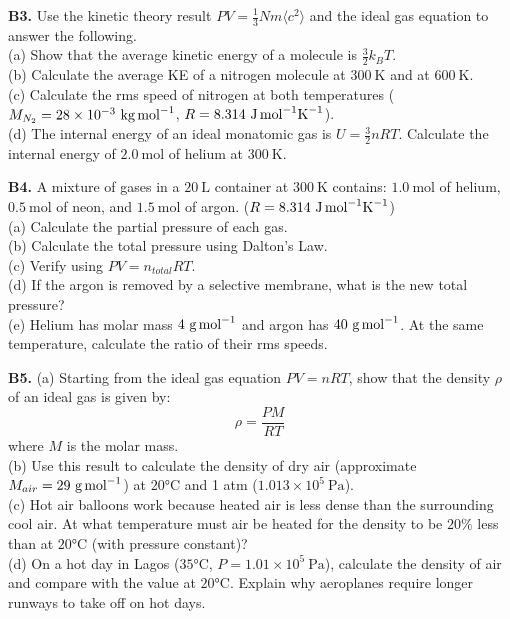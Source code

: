 \begin{exercisebox}[14]
\vspace{0.4cm}

\textbf{B3.} Use the kinetic theory result
$PV = \frac{1}{3}Nm\langle c^2\rangle$ and the
ideal gas equation to answer the following.\\[4pt]
(a) Show that the average kinetic energy of a
molecule is $\frac{3}{2}k_BT$.\\
(b) Calculate the average KE of a nitrogen
molecule at $300\ \text{K}$ and at $600\ \text{K}$.\\
(c) Calculate the rms speed of nitrogen at both
temperatures ($M_{N_2} = 28\times10^{-3}\ \text{kg\,mol}^{-1}$,
$R = 8.314\ \text{J\,mol}^{-1}\text{K}^{-1}$).\\
(d) The internal energy of an ideal monatomic gas
is $U = \frac{3}{2}nRT$. Calculate the internal
energy of $2.0\ \text{mol}$ of helium at $300\ \text{K}$.
\hfill{}

\vspace{0.4cm}

\textbf{B4.} A mixture of gases in a $20\ \text{L}$
container at $300\ \text{K}$ contains:
$1.0\ \text{mol}$ of helium,
$0.5\ \text{mol}$ of neon, and
$1.5\ \text{mol}$ of argon.
($R = 8.314\ \text{J\,mol}^{-1}\text{K}^{-1}$)\\[4pt]
(a) Calculate the partial pressure of each gas.\\
(b) Calculate the total pressure using Dalton's
Law.\\
(c) Verify using $PV = n_{total}RT$.\\
(d) If the argon is removed by a selective
membrane, what is the new total pressure?\\
(e) Helium has molar mass $4\ \text{g\,mol}^{-1}$
and argon has $40\ \text{g\,mol}^{-1}$. At the
same temperature, calculate the ratio of their
rms speeds.
\hfill{}

\vspace{0.4cm}

\textbf{B5.} (a) Starting from the ideal gas
equation $PV = nRT$, show that the density $\rho$
of an ideal gas is given by:
\[
  \rho = \frac{PM}{RT}
\]
where $M$ is the molar mass.\\[4pt]
(b) Use this result to calculate the density of
dry air (approximate $M_{air} = 29\ \text{g\,mol}^{-1}$)
at $20°\text{C}$ and 1 atm ($1.013\times10^5\ \text{Pa}$).\\
(c) Hot air balloons work because heated air is
less dense than the surrounding cool air. At what
temperature must air be heated for the density to
be $20\%$ less than at $20°\text{C}$ (with
pressure constant)?\\
(d) On a hot day in Lagos ($35°\text{C}$,
$P = 1.01\times10^5\ \text{Pa}$), calculate the
density of air and compare with the value at $20°\text{C}$.
Explain why aeroplanes require longer runways to
take off on hot days.
\hfill{}

\end{exercisebox}
